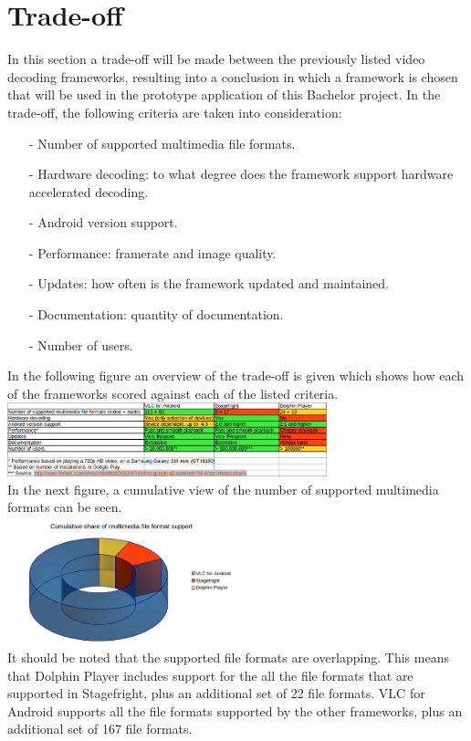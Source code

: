 \section{Trade-off}
In this section a trade-off will be made between the previously listed video decoding frameworks, resulting into a conclusion in which a framework is chosen that will be used in the prototype application of this Bachelor project. In the trade-off, the following criteria are taken into consideration:
\begin{itemize}
	\item[-]Number of supported multimedia file formats.
	\item[-]Hardware decoding: to what degree does the framework support hardware accelerated decoding. 
	\item[-]Android version support.
	\item[-]Performance: framerate and image quality.
	\item[-]Updates: how often is the framework updated and maintained.
	\item[-]Documentation: quantity of documentation. 
	\item[-]Number of users.
\end{itemize}
In the following figure an overview of the trade-off is given which shows how each of the frameworks scored against each of the listed criteria.\\
\newline
\includegraphics[width=350px]{video_decoding/tradeoff.png}\\
\newline
In the next figure, a cumulative view of the number of supported multimedia formats can be seen.\\
\newline
\includegraphics[width=250px]{video_decoding/cumulativeshare.png}\\
\newline
It should be noted that the supported file formats are overlapping. This means that Dolphin Player includes support for the all the file formats that are supported in Stagefright, plus an additional set of 22 file formats. VLC for Android supports all the file formats supported by the other frameworks, plus an additional set of 167 file formats.\\




